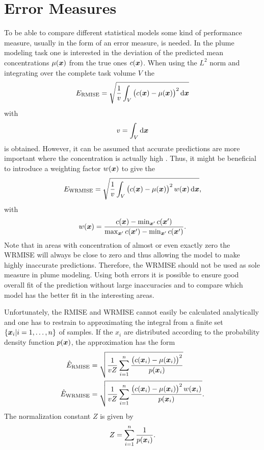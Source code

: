\chapter{Error Measures}\label{sec:error}
To be able to compare different statistical models some kind of performance 
measure, usually in the form of an error measure, is needed. In the plume 
modeling task one is interested in the deviation of the predicted mean 
concentrations $\mu(\bm{x})$ from the true ones $c(\bm{x})$. When using the $L^2$ 
norm and integrating over the complete task volume $V$ the 
\begin{equation}
    E\ped{RMISE} = \sqrt{\frac{1}{v} \int_V \del{c(\vc x) - \mu(\vc x)}^2 
        \dif\vc x}
\end{equation}
with
\begin{equation}
    v = \int_V \dif\vc x
\end{equation}
is obtained. However, it can be assumed that accurate predictions are more 
important where the concentration is actually high 
\parencite[cp.][]{Marchant:2012wb}. Thus, it might be beneficial to introduce 
a weighting factor $w(\bm{x})$ to give the 
\begin{equation}
    E\ped{WRMISE} = \sqrt{\frac{1}{v} \int_V \del{c(\vc x) - \mu(\vc x)}^2 w(\vc 
        x) \dif\vc x} \text{,}
\end{equation}
with
\begin{equation}
    w(\bm{x}) = \frac{c(\bm{x}) - \min_{\bm{x}'} c(\bm{x}')}{\max_{\bm{x}'} c(\bm{x}') 
        - \min_{\bm{x}'} c(\bm{x}')} \text{.}
\end{equation}
Note that in areas with concentration of almost or even exactly zero the WRMISE 
will always be close to zero and thus allowing the model to make highly 
inaccurate predictions. Therefore, the WRMISE should not be used as sole measure 
in plume modeling. Using both errors it is possible to ensure good overall fit 
of the prediction without large inaccuracies and to compare which model has the 
better fit in the interesting areas.

Unfortunately, the RMISE and WRMISE cannot easily be calculated analytically and 
one has to restrain to approximating the integral from a finite set $\{\bm{x}_i 
| i = 1, \dots, n\}$ of samples. If the $x_i$ are distributed according to the 
probability density function $p(\bm{x})$, the approximation has the form
\begin{align}
    \hat E\ped{RMISE} &= \sqrt{\frac{1}{vZ} \sum_{i=1}^n \frac{\del{c(\vc x_i) 
                - \mu(\vc x_i)}^2}{p(\vc x_i)}} \\
    \hat E\ped{WRMISE} &= \sqrt{\frac{1}{vZ} \sum_{i=1}^n \frac{\del{c(\vc x_i) 
                - \mu(\vc x_i)}^2 w(\vc x_i)}{p(\vc x_i)}} \text{.}
\end{align}
The normalization constant $Z$ is given by
\begin{equation}
    Z = \sum_{i=1}^n \frac{1}{p(\bm{x}_i)} \text{.}
\end{equation}

